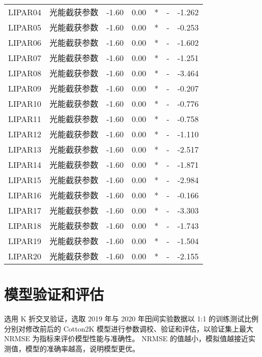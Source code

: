 \begin{longtable}{llrrcrr}
    LIPAR04  & 光能截获参数               & -1.60  & 0.00   & *   & -       & -1.262  \\
    LIPAR05  & 光能截获参数               & -1.60  & 0.00   & *   & -       & -0.253  \\
    LIPAR06  & 光能截获参数               & -1.60  & 0.00   & *   & -       & -1.602  \\
    LIPAR07  & 光能截获参数               & -1.60  & 0.00   & *   & -       & -1.251  \\
    LIPAR08  & 光能截获参数               & -1.60  & 0.00   & *   & -       & -3.464  \\
    LIPAR09  & 光能截获参数               & -1.60  & 0.00   & *   & -       & -0.207  \\
    LIPAR10  & 光能截获参数               & -1.60  & 0.00   & *   & -       & -0.776  \\
    LIPAR11  & 光能截获参数               & -1.60  & 0.00   & *   & -       & -0.758  \\
    LIPAR12  & 光能截获参数               & -1.60  & 0.00   & *   & -       & -1.110  \\
    LIPAR13  & 光能截获参数               & -1.60  & 0.00   & *   & -       & -2.517  \\
    LIPAR14  & 光能截获参数               & -1.60  & 0.00   & *   & -       & -1.871  \\
    LIPAR15  & 光能截获参数               & -1.60  & 0.00   & *   & -       & -2.984  \\
    LIPAR16  & 光能截获参数               & -1.60  & 0.00   & *   & -       & -0.166  \\
    LIPAR17  & 光能截获参数               & -1.60  & 0.00   & *   & -       & -3.303  \\
    LIPAR18  & 光能截获参数               & -1.60  & 0.00   & *   & -       & -1.743  \\
    LIPAR19  & 光能截获参数               & -1.60  & 0.00   & *   & -       & -1.504  \\
    LIPAR20  & 光能截获参数               & -1.60  & 0.00   & *   & -       & -2.155  \\
\end{longtable}

\section{模型验证和评估}

选用 K 折交叉验证，选取 2019 年与 2020 年田间实验数据以 1:1 的训练测试比例分别对修改前后的 Cotton2K 模型进行参数调校、验证和评估，以验证集上最大 NRMSE 为指标来评价模型性能与准确性。%
NRMSE 的值越小，模拟值越接近实测值，模型的准确率越高，说明模型更优。

